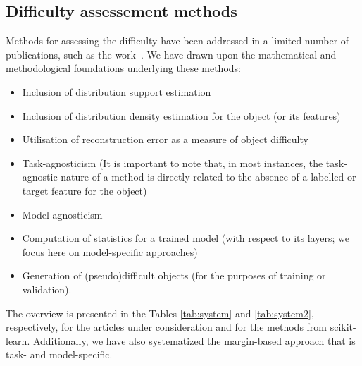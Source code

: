 \documentclass{article}
\begin{document}
\subsection{Difficulty assessement methods}\label{diff}
Methods for assessing the difficulty have been addressed in a limited number of publications, such as the work~\cite{seedat2024dissecting}. We have drawn upon the mathematical and methodological foundations underlying these methods:

\begin{itemize}
    \item Inclusion of distribution support estimation
    \item Inclusion of distribution density estimation for the object (or its features)
    \item Utilisation of reconstruction error as a measure of object difficulty
    \item Task-agnosticism (It is important to note that, in most instances, the task-agnostic nature of a method is directly related to the absence of a labelled or target feature for the object)
    \item Model-agnosticism
    \item Computation of statistics for a trained model (with respect to its layers; we focus here on model-specific approaches)
    \item Generation of (pseudo)difficult objects (for the purposes of training or validation).
\end{itemize}

The overview is presented in the Tables \ref{tab:system} and \ref{tab:system2}, respectively, for the articles under consideration and for the methods from scikit-learn. Additionally, we have also systematized the margin-based approach that is task- and model-specific.
\end{document}

